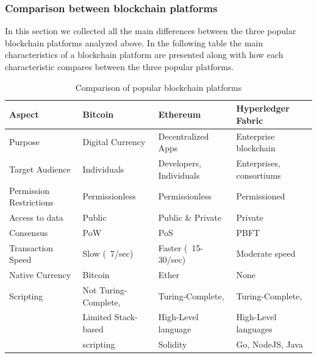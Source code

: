 \subsubsection{Comparison between blockchain platforms}
In this section we collected all the main differences between the three popular blockchain platforms analyzed above.
In the following table the main characteristics of a blockchain platform are presented along with how each characteristic compares
between the three popular platforms.
\begin{table}[h!]
    \centering
    \begin{tabular}[rounded-corners]{l|lll}
        \textbf{Aspect}         & \textbf{Bitcoin}     & \textbf{Ethereum}          & \textbf{Hyperledger Fabric} \\
        \hline
        Purpose                 & Digital Currency     & Decentralized Apps         & Enterprise blockchain       \\[5pt]
        Target Audience         & Individuals          & Developers, Individuals    & Enterprises, consortiums    \\[5pt]
        Permission Restrictions & Permissionless       & Permissionless             & Permissioned                \\[5pt]
        Access to data          & Public               & Public \& Private          & Private                     \\[5pt]
        Consensus               & PoW                  & PoS                        & PBFT                        \\[5pt]
        Transaction Speed       & Slow (~7/sec)        & Faster (~15-30/sec)        & Moderate speed              \\[5pt]
        Native Currency         & Bitcoin              & Ether                      & None                        \\[5pt]
        Scripting               & Not Turing-Complete, & Turing-Complete,           & Turing-Complete,            \\
                                & Limited Stack-based  & High-Level language        & High-Level languages        \\
                                & scripting            & Solidity                   & Go, NodeJS, Java            \\[5pt]
    \end{tabular}
    \caption{Comparison of popular blockchain platforms}
\end{table}


